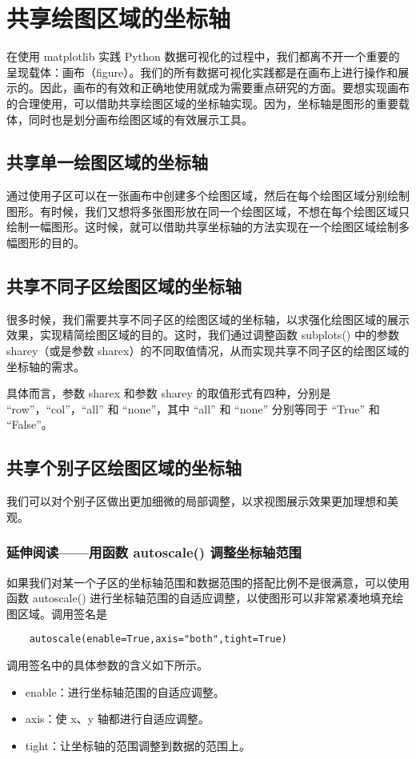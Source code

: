 \chapter{共享绘图区域的坐标轴}
在使用 matplotlib 实践 Python 数据可视化的过程中，我们都离不开一个重要的呈现载体：画布（figure）。我们的所有数据可视化实践都是在画布上进行操作和展示的。因此，画布的有效和正确地使用就成为需要重点研究的方面。要想实现画布的合理使用，可以借助共享绘图区域的坐标轴实现。因为，坐标轴是图形的重要载体，同时也是划分画布绘图区域的有效展示工具。
\section{共享单一绘图区域的坐标轴}
通过使用子区可以在一张画布中创建多个绘图区域，然后在每个绘图区域分别绘制图形。有时候，我们又想将多张图形放在同一个绘图区域，不想在每个绘图区域只绘制一幅图形。这时候，就可以借助共享坐标轴的方法实现在一个绘图区域绘制多幅图形的目的。

\section{共享不同子区绘图区域的坐标轴}
很多时候，我们需要共享不同子区的绘图区域的坐标轴，以求强化绘图区域的展示效果，实现精简绘图区域的目的。这时，我们通过调整函数 subplots() 中的参数 sharey（或是参数 sharex）的不同取值情况，从而实现共享不同子区的绘图区域的坐标轴的需求。

具体而言，参数 sharex 和参数 sharey 的取值形式有四种，分别是 “row”，“col”，“all” 和 “none”，其中 “all” 和 “none” 分别等同于 “True” 和 “False”。
\section{共享个别子区绘图区域的坐标轴}
我们可以对个别子区做出更加细微的局部调整，以求视图展示效果更加理想和美观。
\subsection{延伸阅读——用函数 autoscale() 调整坐标轴范围}
如果我们对某一个子区的坐标轴范围和数据范围的搭配比例不是很满意，可以使用函数 autoscale() 进行坐标轴范围的自适应调整，以使图形可以非常紧凑地填充绘图区域。调用签名是
\begin{verbatim}
    autoscale(enable=True,axis="both",tight=True)
\end{verbatim}
调用签名中的具体参数的含义如下所示。
\begin{itemize}
    \item enable：进行坐标轴范围的自适应调整。
    \item axis：使 x、y 轴都进行自适应调整。
    \item tight：让坐标轴的范围调整到数据的范围上。
\end{itemize}